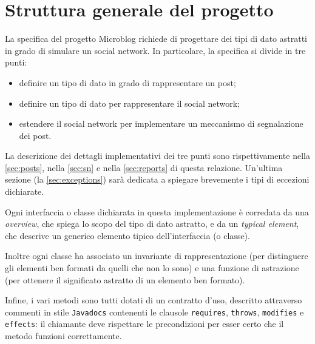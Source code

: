 \section{Struttura generale del progetto}

La specifica del progetto Microblog richiede di progettare dei tipi di dato astratti in grado di simulare un social network. In particolare, la specifica si divide in tre punti:
\begin{itemize}
    \item definire un tipo di dato in grado di rappresentare un post;
    \item definire un tipo di dato per rappresentare il social network;
    \item estendere il social network per implementare un meccanismo di segnalazione dei post.
\end{itemize}

La descrizione dei dettagli implementativi dei tre punti sono rispettivamente nella \autoref{sec:posts}, nella \autoref{sec:sn} e nella \autoref{sec:reports} di questa relazione. Un'ultima sezione (la \autoref{sec:exceptions}) sarà dedicata a spiegare brevemente i tipi di eccezioni dichiarate.

Ogni interfaccia o classe dichiarata in questa implementazione è corredata da una \emph{overview}, che spiega lo scopo del tipo di dato astratto, e da un \emph{typical element}, che descrive un generico elemento tipico dell'interfaccia (o classe).

Inoltre ogni classe ha associato un invariante di rappresentazione (per distinguere gli elementi ben formati da quelli che non lo sono) e una funzione di astrazione (per ottenere il significato astratto di un elemento ben formato).

Infine, i vari metodi sono tutti dotati di un contratto d'uso, descritto attraverso commenti in stile \texttt{Javadocs} contenenti le clausole \texttt{requires}, \texttt{throws}, \texttt{modifies} e \texttt{effects}: il chiamante deve rispettare le precondizioni per esser certo che il metodo funzioni correttamente.
